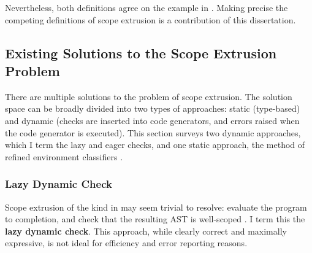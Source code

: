 Nevertheless, both definitions agree on the example in . Making precise the competing definitions of scope extrusion is a contribution of this dissertation. 

\subsection{Existing Solutions to the Scope Extrusion Problem}
There are multiple solutions to the problem of scope extrusion. The solution space can be broadly divided into two types of approaches: static (type-based) and dynamic (checks are inserted into code generators, and errors raised when the code generator is executed). This section surveys two dynamic approaches, which I term the lazy and eager checks, and one static approach, the method of refined environment classifiers \citep{kiselyov-16,isoda-24}. 

\subsubsection{Lazy Dynamic Check}\label{subsubsection:lazy-dynamic-check}
Scope extrusion of the kind in  may seem trivial to resolve: evaluate the program to completion, and check that the resulting AST is well-scoped \citep{kiselyov-14}. I term this the \textbf{lazy dynamic check}. This approach, while clearly correct and maximally expressive, is not ideal for efficiency and error reporting reasons. 

